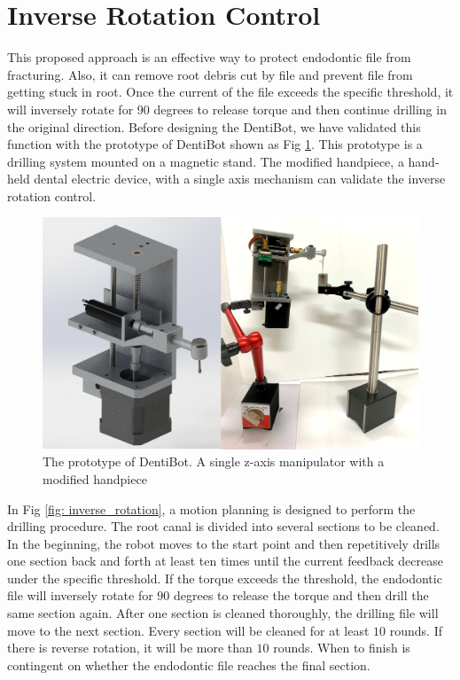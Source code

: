 \section{Inverse Rotation Control}
\label{sec:Inverse Rotation Control}
\hspace*{6mm}This proposed approach is an effective way to protect endodontic file from fracturing. Also, it can remove root debris cut by file and prevent file from getting stuck in root. Once the current of the file exceeds the specific threshold, it will inversely rotate for 90 degrees to release torque and then continue drilling in the original direction. Before designing the DentiBot, we have validated this function with the prototype of DentiBot shown as Fig \ref{fig: prototype}. This prototype is a drilling system mounted on a magnetic stand. The modified handpiece, a hand-held dental electric device, with a single axis mechanism can validate the inverse rotation control. 
\begin{figure}[htbp]
\begin{center}
\includegraphics[width=0.9\linewidth]{Images/Prototype.png}
\caption{The prototype of DentiBot. A single z-axis manipulator with a modified handpiece}
\label{fig: prototype}
\end{center}
\end{figure}	
\par
In Fig \ref{fig: inverse_rotation}, a motion planning is designed to perform the drilling procedure. The root canal is divided into several sections to be cleaned. In the beginning, the robot moves to the start point and then repetitively drills one section back and forth at least ten times until the current feedback decrease under the specific threshold. If the torque exceeds the threshold, the endodontic file will inversely rotate for $90$ degrees to release the torque and then drill the same section again. After one section is cleaned thoroughly, the drilling file will move to the next section. Every section will be cleaned for at least $10$ rounds. If there is reverse rotation, it will be more than $10$ rounds. When to finish is contingent on whether the endodontic file reaches the final section.
